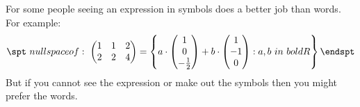For some people seeing an expression in symbols does a better job than words.  For example:
\begin{equation}
\spt
    \Null
    \begin{pmatrix}
        1 & 1 & 2\\ 2 & 2 & 4
    \end{pmatrix}
    = \left\{
        a\cdot
        \begin{pmatrix}
            1 \\ 0 \\ -\frac{1}{2}
        \end{pmatrix}
        +
        b\cdot
        \begin{pmatrix}
            1 \\ -1 \\ 0 
        \end{pmatrix}    
        :
        a,b\in \mathbb{R}
        \right\}        
\endspt
\end{equation}
But if you cannot see the expression or make out the symbols then you might prefer the words.
